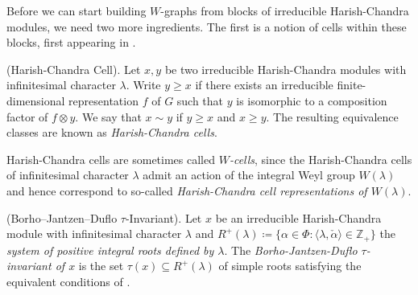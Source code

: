 \noindent Before we can start building $W$-graphs from blocks of irreducible Harish-Chandra modules, we need two more ingredients. The first is a notion of cells within these blocks, first appearing in \cite{BV83}.\\

\noindent\begin{definition}\textup{(Harish-Chandra Cell).} Let $x, y$ be two irreducible Harish-Chandra modules with infinitesimal character $\lambda$. Write $y \geq x$ if there exists an irreducible finite-dimensional representation $f$ of $G$ such that $y$ is isomorphic to a composition factor of $f \otimes y$. We say that $x \sim y$ if $y \geq x$ and $x \geq y$. The resulting equivalence classes are known as {\em Harish-Chandra cells}.\\
\end{definition}

\noindent\begin{remark} Harish-Chandra cells are sometimes called {\em $W$-cells}, since the Harish-Chandra cells of infinitesimal character $\lambda$ admit an action of the integral Weyl group $W(\lambda)$ and hence correspond to so-called {\em Harish-Chandra cell representations of $W(\lambda)$}.\\
\end{remark}

\noindent\begin{definition}\textup{(Borho--Jantzen--Duflo $\tau$-Invariant).} Let $x$ be an irreducible Harish-Chandra module with infinitesimal character $\lambda$ and $R^+(\lambda) \coloneqq \{\alpha \in \Phi : \langle\lambda, \check{\alpha}\rangle \in \mathbb{Z}_+\}$ the {\em system of positive integral roots defined by $\lambda$}. The {\em Borho-Jantzen-Duflo $\tau$-invariant of $x$} is the set $\tau(x) \subseteq R^+(\lambda)$ of simple roots satisfying the equivalent conditions of \cite[Corollary 7.2.27]{Vog81}.\\[\linespacing]
\end{definition}

